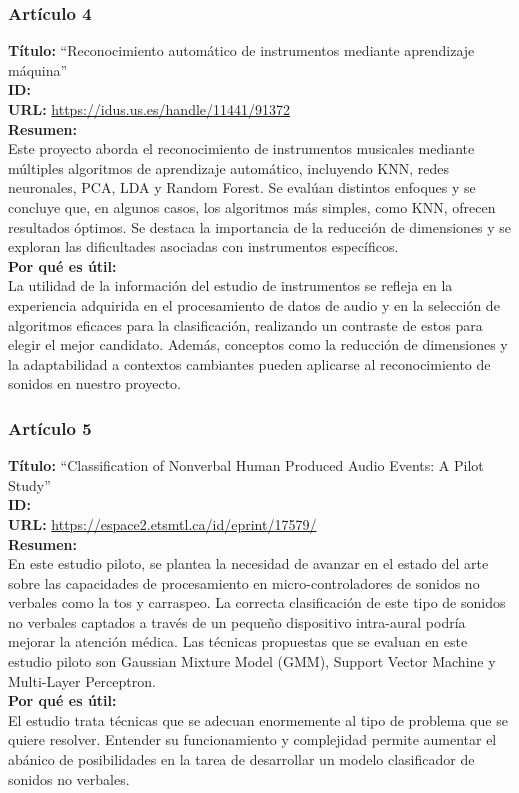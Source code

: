 \subsubsection*{Artículo 4}
    \textbf{Título:}
    “Reconocimiento automático de instrumentos mediante aprendizaje máquina”
    \\
    \textbf{ID: \cite{salgado2019reconocimiento}}
    \\
    \textbf{URL:}
    \url{https://idus.us.es/handle/11441/91372}
    \\
    \textbf{Resumen:\\}
    Este proyecto aborda el reconocimiento de instrumentos musicales mediante múltiples algoritmos de aprendizaje automático, incluyendo KNN, redes neuronales, PCA, LDA y Random Forest. Se evalúan distintos enfoques y se concluye que, en algunos casos, los algoritmos más simples, como KNN, ofrecen resultados óptimos. Se destaca la importancia de la reducción de dimensiones y se exploran las dificultades asociadas con instrumentos específicos.
    \\
    \textbf{Por qué es útil:\\}
    La utilidad de la información del estudio de instrumentos se refleja en la experiencia adquirida en el procesamiento de datos de audio y en la selección de algoritmos eficaces para la clasificación, realizando un contraste de estos para elegir el mejor candidato. Además, conceptos como la reducción de dimensiones y la adaptabilidad a contextos cambiantes pueden aplicarse al reconocimiento de sonidos en nuestro proyecto.
\subsubsection*{Artículo 5}
    \textbf{Título:}
    “Classification of Nonverbal Human Produced Audio Events: A Pilot Study”
    \\
    \textbf{ID: \cite{bouserhal2018classification}}
    \\
    \textbf{URL:}
    \url{https://espace2.etsmtl.ca/id/eprint/17579/}
    \\
    \textbf{Resumen:\\}
    En este estudio piloto, se plantea la necesidad de avanzar en el estado del arte sobre las capacidades de procesamiento en micro-controladores de sonidos no verbales como la tos y carraspeo. La correcta clasificación de este tipo de sonidos no verbales captados a través de un pequeño dispositivo intra-aural podría mejorar la atención médica. Las técnicas propuestas que se evaluan en este estudio piloto son Gaussian Mixture Model (GMM), Support Vector Machine y Multi-Layer Perceptron.
    \\
    \textbf{Por qué es útil:\\}
    El estudio trata técnicas que se adecuan enormemente al tipo de problema que se quiere resolver. Entender su funcionamiento y complejidad permite aumentar el abánico de posibilidades en la tarea de desarrollar un modelo clasificador de sonidos no verbales.
